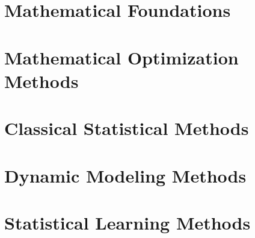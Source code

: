 \documentclass[oneside,hidelinks,12pt,letterpaper]{scrbook} %
\theoremstyle{remark}
\theoremstyle{coloredRemark}
\theoremstyle{coloredNote}
\begin{document}
\newpage

\listofalgorithms
\listoffigures
\listoftables

\dominitoc
\tableofcontents 



\hypersetup{
	colorlinks=true,
	linkcolor=blue}

\mainmatter

\printnomenclature





\part{Mathematical Foundations}


%
%
%


\part{Mathematical Optimization Methods}

%
%
\part{Classical Statistical Methods}
%
%
%

%

%

\part{Dynamic Modeling Methods}



%
%
%
%






\part{Statistical Learning Methods}


\end{document}
